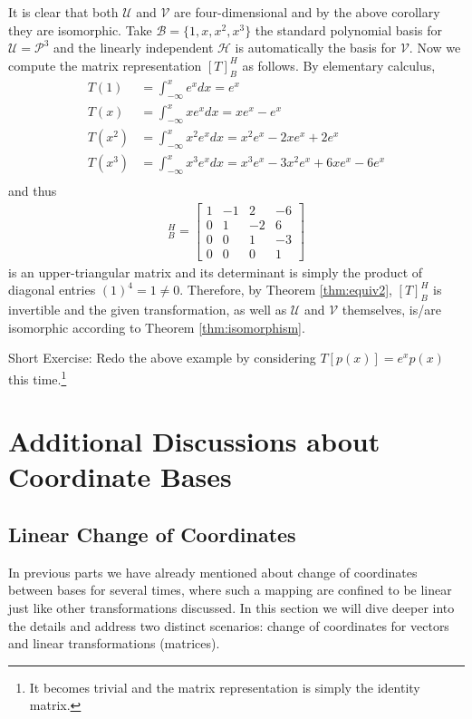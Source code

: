 \begin{solution}
It is clear that both $\mathcal{U}$ and $\mathcal{V}$ are four-dimensional and by the above corollary they are isomorphic. Take $\mathcal{B} = \{1, x, x^2, x^3\}$ the standard polynomial basis for $\mathcal{U} = \mathcal{P}^3$ and the linearly independent $\mathcal{H}$ is automatically the basis for $\mathcal{V}$. Now we compute the matrix representation $[T]_B^H$ as follows. By elementary calculus,
\begin{align*}
T(1) &= \int_{-\infty}^x e^x dx = e^x \\
T(x) &= \int_{-\infty}^x xe^x dx = xe^x - e^x \\
T(x^2) &= \int_{-\infty}^x x^2e^x dx = x^2e^x - 2xe^x + 2e^x \\
T(x^3) &= \int_{-\infty}^x x^3e^x dx = x^3e^x - 3x^2e^x + 6xe^x - 6e^x \\
\end{align*}
and thus
\begin{align*}
[T]_B^H = 
\begin{bmatrix}
1 & -1 & 2 & -6 \\ 
0 & 1 & -2 & 6 \\
0 & 0 & 1 & -3 \\
0 & 0 & 0 & 1
\end{bmatrix}
\end{align*}
is an upper-triangular matrix and its determinant is simply the product of diagonal entries $(1)^4 = 1 \neq 0$. Therefore, by Theorem \ref{thm:equiv2}, $[T]_B^H$ is invertible and the given transformation, as well as $\mathcal{U}$ and $\mathcal{V}$ themselves, is/are isomorphic according to Theorem \ref{thm:isomorphism}.
\end{solution}
Short Exercise: Redo the above example by considering $T[p(x)] = e^x p(x)$ this time.\footnote{It becomes trivial and the matrix representation is simply the identity matrix.}

\section{Additional Discussions about Coordinate Bases}

\subsection{Linear Change of Coordinates}
\label{section:coordchange}

In previous parts we have already mentioned about change of coordinates between bases for several times, where such a mapping are confined to be linear just like other transformations discussed. In this section we will dive deeper into the details and address two distinct scenarios: change of coordinates for vectors and linear transformations (matrices).

